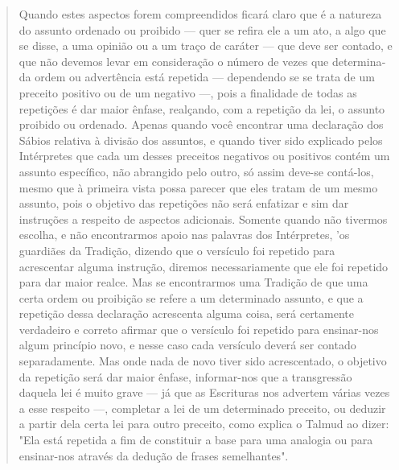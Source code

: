 \begin{quote}
Quando estes aspectos forem compreendidos ficará claro que é a na­tureza
do assunto ordenado ou proibido --- quer se refira ele a um ato, a algo
que se disse, a uma opinião ou a um traço de caráter --- que deve ser
contado, e que não devemos levar em consideração o número de vezes que
determina­da ordem ou advertência está repetida --- dependendo se se
trata de um precei­to positivo ou de um negativo ---, pois a finalidade
de todas as repetições é dar maior ênfase, realçando, com a repetição da
lei, o assunto proibido ou ordena­do. Apenas quando você encontrar uma
declaração dos Sábios relativa à divi­são dos assuntos, e quando tiver
sido explicado pelos Intérpretes que cada um desses preceitos negativos
ou positivos contém um assunto específico, não abrangido pelo outro, só
assim deve-se contá-los, mesmo que à primeira vista possa parecer que
eles tratam de um mesmo assunto, pois o objetivo das repe­tições não
será enfatizar e sim dar instruções a respeito de aspectos adicionais.
Somente quando não tivermos escolha, e não encontrarmos apoio nas
palavras dos Intérpretes, 'os guardiães da Tradição, dizendo que o
versículo foi repetido para acrescentar alguma instrução, diremos
necessariamente que ele foi repeti­do para dar maior realce. Mas se
encontrarmos uma Tradição de que uma certa ordem ou proibição se refere
a um determinado assunto, e que a repetição des­sa declaração acrescenta
alguma coisa, será certamente verdadeiro e correto afir­mar que o
versículo foi repetido para ensinar-nos algum princípio novo, e nes­se
caso cada versículo deverá ser contado separadamente. Mas onde nada de
novo tiver sido acrescentado, o objetivo da repetição será dar maior
ênfase, informar-nos que a transgressão daquela lei é muito grave --- já
que as Escritu­ras nos advertem várias vezes a esse respeito ---,
completar a lei de um determi­nado preceito, ou deduzir a partir dela
certa lei para outro preceito, como ex­plica o Talmud ao dizer: "Ela
está repetida a fim de constituir a base para uma analogia ou para
ensinar-nos através da dedução de frases semelhantes".


\end{quote}
